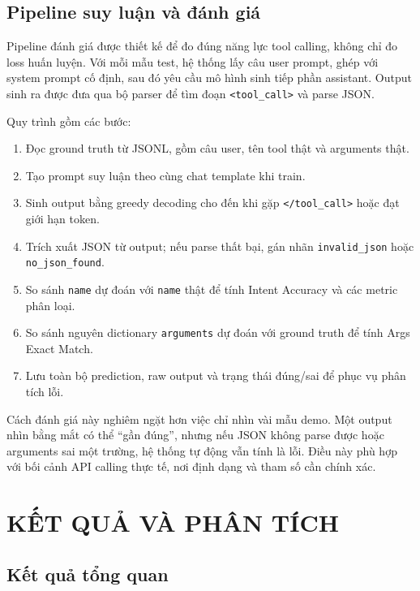 \documentclass[12pt,a4paper,oneside]{report}
\newlength{\manualparindent}
\newcommand{\manualindent}{\hspace*{\manualparindent}}
\begin{document}
\section{Pipeline suy luận và đánh giá}

\manualindent%
Pipeline đánh giá được thiết kế để đo đúng năng lực tool calling, không chỉ đo loss huấn luyện. Với mỗi mẫu test, hệ thống lấy câu user prompt, ghép với system prompt cố định, sau đó yêu cầu mô hình sinh tiếp phần assistant. Output sinh ra được đưa qua bộ parser để tìm đoạn \texttt{<tool\_call>} và parse JSON.

\manualindent%
Quy trình gồm các bước:

\begin{enumerate}[label=\arabic*.]
  \item Đọc ground truth từ JSONL, gồm câu user, tên tool thật và arguments thật.
  \item Tạo prompt suy luận theo cùng chat template khi train.
  \item Sinh output bằng greedy decoding cho đến khi gặp \texttt{</tool\_call>} hoặc đạt giới hạn token.
  \item Trích xuất JSON từ output; nếu parse thất bại, gán nhãn \texttt{invalid\_json} hoặc \texttt{no\_json\_found}.
  \item So sánh \texttt{name} dự đoán với \texttt{name} thật để tính Intent Accuracy và các metric phân loại.
  \item So sánh nguyên dictionary \texttt{arguments} dự đoán với ground truth để tính Args Exact Match.
  \item Lưu toàn bộ prediction, raw output và trạng thái đúng/sai để phục vụ phân tích lỗi.
\end{enumerate}

\manualindent%
Cách đánh giá này nghiêm ngặt hơn việc chỉ nhìn vài mẫu demo. Một output nhìn bằng mắt có thể ``gần đúng'', nhưng nếu JSON không parse được hoặc arguments sai một trường, hệ thống tự động vẫn tính là lỗi. Điều này phù hợp với bối cảnh API calling thực tế, nơi định dạng và tham số cần chính xác.

\chapter{KẾT QUẢ VÀ PHÂN TÍCH}

\section{Kết quả tổng quan}
\end{document}
